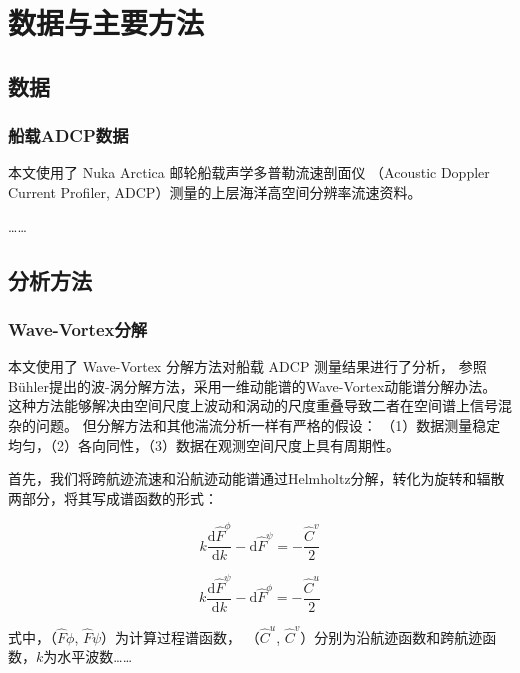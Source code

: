 \chapter{数据与主要方法}

\section{数据}

\subsection{船载ADCP数据}

本文使用了 Nuka Arctica 邮轮船载声学多普勒流速剖面仪
（Acoustic Doppler Current Profiler, ADCP）测量的上层海洋高空间分辨率流速资料。

……

\section{分析方法}

\subsection{Wave-Vortex分解}

本文使用了 Wave-Vortex 分解方法对船载 ADCP 测量结果进行了分析，
参照Bühler提出的波-涡分解方法\cite{buhler2014wave-vortex}，采用一维动能谱的Wave-Vortex动能谱分解办法。
这种方法能够解决由空间尺度上波动和涡动的尺度重叠导致二者在空间谱上信号混杂的问题。
但分解方法和其他湍流分析一样有严格的假设：
（1）数据测量稳定均匀，（2）各向同性，（3）数据在观测空间尺度上具有周期性。

首先，我们将跨航迹流速和沿航迹动能谱通过Helmholtz分解，转化为旋转和辐散两部分，将其写成谱函数的形式：

\begin{equation}
  k\frac{\mathrm{d}\widehat{F}^{\phi}}{\mathrm{d}k} - \mathrm{d}\widehat{F}^{\psi}
    = -\frac{\widehat{C}^{v}}{2}
\end{equation}

\begin{equation}
  k\frac{\mathrm{d}\widehat{F}^{\psi}}{\mathrm{d}k} - \mathrm{d}\widehat{F}^{\phi}
    = -\frac{\widehat{C}^{u}}{2}
\end{equation}

式中，（$\widehat{F}{\phi}$, $\widehat{F}{\psi}$）为计算过程谱函数，
（$\widehat{C}^{u}$, $\widehat{C}^{v}$）分别为沿航迹函数和跨航迹函数，$k$为水平波数……
